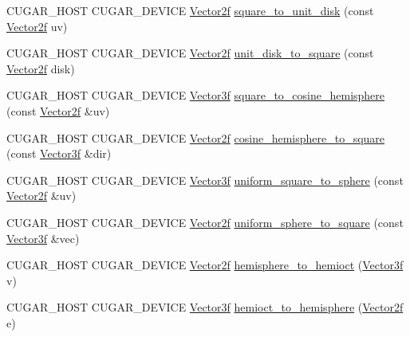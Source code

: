 \begin{DoxyCompactItemize}
\item 
C\+U\+G\+A\+R\+\_\+\+H\+O\+ST C\+U\+G\+A\+R\+\_\+\+D\+E\+V\+I\+CE \hyperlink{structcugar_1_1_vector}{Vector2f} \hyperlink{group__spherical__mappings_ga1c891ec8d6e220337a3e39e6dc286e9b}{square\+\_\+to\+\_\+unit\+\_\+disk} (const \hyperlink{structcugar_1_1_vector}{Vector2f} uv)
\item 
C\+U\+G\+A\+R\+\_\+\+H\+O\+ST C\+U\+G\+A\+R\+\_\+\+D\+E\+V\+I\+CE \hyperlink{structcugar_1_1_vector}{Vector2f} \hyperlink{group__spherical__mappings_ga76c7dc3d9379efe5b51c700e28edd8a6}{unit\+\_\+disk\+\_\+to\+\_\+square} (const \hyperlink{structcugar_1_1_vector}{Vector2f} disk)
\item 
C\+U\+G\+A\+R\+\_\+\+H\+O\+ST C\+U\+G\+A\+R\+\_\+\+D\+E\+V\+I\+CE \hyperlink{structcugar_1_1_vector}{Vector3f} \hyperlink{group__spherical__mappings_gab558fab9acdf1ea100f19dff7c6215c4}{square\+\_\+to\+\_\+cosine\+\_\+hemisphere} (const \hyperlink{structcugar_1_1_vector}{Vector2f} \&uv)
\item 
C\+U\+G\+A\+R\+\_\+\+H\+O\+ST C\+U\+G\+A\+R\+\_\+\+D\+E\+V\+I\+CE \hyperlink{structcugar_1_1_vector}{Vector2f} \hyperlink{group__spherical__mappings_ga31615ccce21cd9f1161aaabf87f89b9b}{cosine\+\_\+hemisphere\+\_\+to\+\_\+square} (const \hyperlink{structcugar_1_1_vector}{Vector3f} \&dir)
\item 
C\+U\+G\+A\+R\+\_\+\+H\+O\+ST C\+U\+G\+A\+R\+\_\+\+D\+E\+V\+I\+CE \hyperlink{structcugar_1_1_vector}{Vector3f} \hyperlink{group__spherical__mappings_gae75ef450df309874ff133b4ec8daee40}{uniform\+\_\+square\+\_\+to\+\_\+sphere} (const \hyperlink{structcugar_1_1_vector}{Vector2f} \&uv)
\item 
C\+U\+G\+A\+R\+\_\+\+H\+O\+ST C\+U\+G\+A\+R\+\_\+\+D\+E\+V\+I\+CE \hyperlink{structcugar_1_1_vector}{Vector2f} \hyperlink{group__spherical__mappings_gaf091547e7d69c8125c7b037aa2d5bd5c}{uniform\+\_\+sphere\+\_\+to\+\_\+square} (const \hyperlink{structcugar_1_1_vector}{Vector3f} \&vec)
\item 
C\+U\+G\+A\+R\+\_\+\+H\+O\+ST C\+U\+G\+A\+R\+\_\+\+D\+E\+V\+I\+CE \hyperlink{structcugar_1_1_vector}{Vector2f} \hyperlink{group__spherical__mappings_ga10f5d3f25177b94512dc15b59a0434bc}{hemisphere\+\_\+to\+\_\+hemioct} (\hyperlink{structcugar_1_1_vector}{Vector3f} v)
\item 
C\+U\+G\+A\+R\+\_\+\+H\+O\+ST C\+U\+G\+A\+R\+\_\+\+D\+E\+V\+I\+CE \hyperlink{structcugar_1_1_vector}{Vector3f} \hyperlink{group__spherical__mappings_ga8acf5ad9380c558633e1aee500d87089}{hemioct\+\_\+to\+\_\+hemisphere} (\hyperlink{structcugar_1_1_vector}{Vector2f} e)

\end{DoxyCompactItemize}
